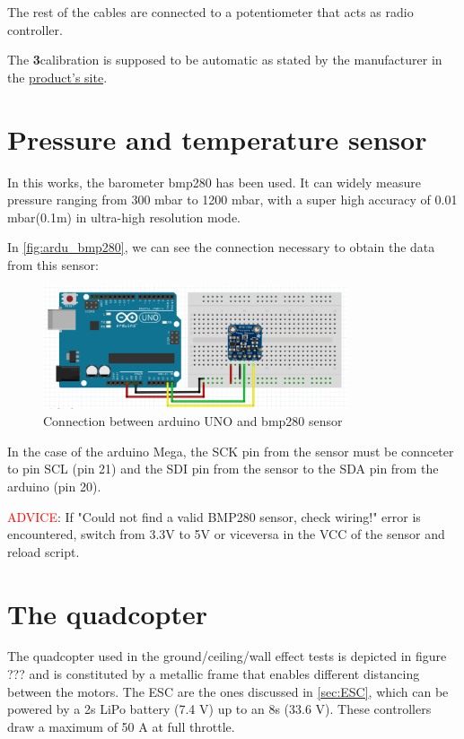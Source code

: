 \documentclass[a4paper]{article}
\begin{document}
{The rest of the cables are connected to a potentiometer that acts as radio controller.

The \textbf3{calibration} is supposed to be automatic as stated by the manufacturer in the \hyperref{https://www.castlecreations.com/en/phoenix-edge-50-esc-010-0102-00}{category}{name}{product's site}.

\section{Pressure and temperature sensor}

In this works, the barometer bmp280 has been used. It can widely measure pressure ranging from 300 mbar to 1200 mbar, with a super high accuracy of 0.01 mbar(0.1m) in ultra-high resolution mode.

In \autoref{fig:ardu_bmp280}, we can see the connection necessary to obtain the data from this sensor:

\begin{figure}[h!]
	\centering
	\includegraphics[width=0.8\textwidth]{Images/bmp280.png}
	\caption{Connection between arduino UNO and bmp280 sensor}
	\label{fig:ardu_bmp280}
\end{figure}


In the case of the arduino Mega, the SCK pin from the sensor must be connceter to pin SCL (pin 21) and the SDI pin from the sensor to the SDA pin from the arduino (pin 20).

\textcolor{red}{ADVICE}: If "Could not find a valid BMP280 sensor,  check wiring!" error is encountered, switch from 3.3V to 5V or viceversa in the VCC of the sensor and reload script.

\section{The quadcopter}

The quadcopter used in the ground/ceiling/wall effect tests is depicted in figure ??? and is constituted by a metallic frame that enables different distancing between the motors. The ESC are the ones discussed in \autoref{sec:ESC}, which can be powered by a 2s LiPo battery (7.4 V) up to an 8s (33.6 V). These controllers draw a maximum of 50 A at full throttle.

}
\end{document}

